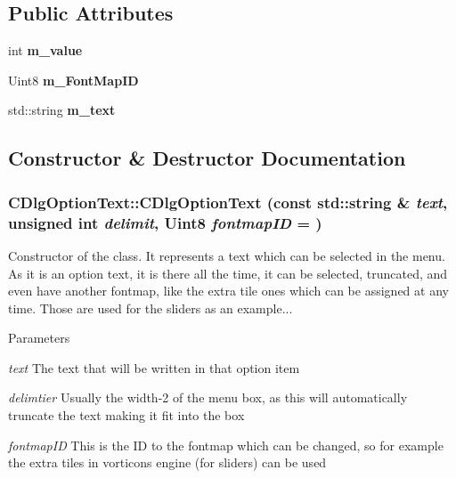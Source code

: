 \subsection*{Public Attributes}
\begin{DoxyCompactItemize}
\item 
\hypertarget{class_c_dlg_option_text_a895a7e133c2c557d9226edd933429756}{
int {\bfseries m\_\-value}}
\label{class_c_dlg_option_text_a895a7e133c2c557d9226edd933429756}

\item 
\hypertarget{class_c_dlg_option_text_a3293e363f35e80755409ab947ff7275f}{
Uint8 {\bfseries m\_\-FontMapID}}
\label{class_c_dlg_option_text_a3293e363f35e80755409ab947ff7275f}

\item 
\hypertarget{class_c_dlg_option_text_aec3744634f1ab50bbec48cb42f81ad37}{
std::string {\bfseries m\_\-text}}
\label{class_c_dlg_option_text_aec3744634f1ab50bbec48cb42f81ad37}

\end{DoxyCompactItemize}


\subsection{Constructor \& Destructor Documentation}
\hypertarget{class_c_dlg_option_text_a6aa84e8218734348752d23b0d75a9da4}{
\subsubsection[{CDlgOptionText}]{\setlength{\rightskip}{0pt plus 5cm}CDlgOptionText::CDlgOptionText (const std::string \& {\em text}, \/  unsigned int {\em delimit}, \/  Uint8 {\em fontmapID} = {})}}
\label{class_c_dlg_option_text_a6aa84e8218734348752d23b0d75a9da4}


Constructor of the class. It represents a text which can be selected in the menu. As it is an option text, it is there all the time, it can be selected, truncated, and even have another fontmap, like the extra tile ones which can be assigned at any time. Those are used for the sliders as an example... 


\begin{DoxyParams}{Parameters}
\item[{\em text}]The text that will be written in that option item \item[{\em delimtier}]Usually the width-\/2 of the menu box, as this will automatically truncate the text making it fit into the box \item[{\em fontmapID}]This is the ID to the fontmap which can be changed, so for example the extra tiles in vorticons engine (for sliders) can be used \end{DoxyParams}


